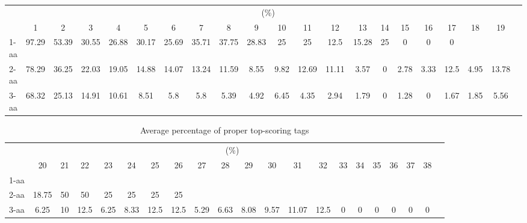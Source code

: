 \begin{table}[h]\tiny
\vspace{3mm}
{\centering
\begin{center}
\begin{tabular}{|l|c|c|c|c|c|c|c|c|c|c|c|c|c|c|c|c|c|c|c|c|}
  \hline
  & \multicolumn{ 19 }{|c|}{(\%)} \\
  \cline{2- 20}
    & 1 & 2 & 3 & 4 & 5 & 6 & 7 & 8 & 9 & 10 & 11 & 12 & 13 & 14 & 15 & 16 & 17 & 18 & 19\\
  \hline
1-aa  & 97.29 & 53.39 & 30.55 & 26.88 & 30.17 & 25.69 & 35.71 & 37.75 & 28.83 & 25 & 25 & 12.5 & 15.28 & 25 & 0 & 0 & 0 &  & \\
2-aa  & 78.29 & 36.25 & 22.03 & 19.05 & 14.88 & 14.07 & 13.24 & 11.59 & 8.55 & 9.82 & 12.69 & 11.11 & 3.57 & 0 & 2.78 & 3.33 & 12.5 & 4.95 & 13.78\\
3-aa  & 68.32 & 25.13 & 14.91 & 10.61 & 8.51 & 5.8 & 5.8 & 5.39 & 4.92 & 6.45 & 4.35 & 2.94 & 1.79 & 0 & 1.28 & 0 & 1.67 & 1.85 & 5.56\\
 \hline
\end{tabular}
\end{center}
\par}
\centering

\vspace{3mm}
\label{table:k}
\end{table}
\begin{table}[h]\tiny
\vspace{3mm}
{\centering
\begin{center}
\begin{tabular}{|l|c|c|c|c|c|c|c|c|c|c|c|c|c|c|c|c|c|c|c|c|}
  \hline
  & \multicolumn{ 19 }{|c|}{(\%)} \\
  \cline{2- 20}
    & 20 & 21 & 22 & 23 & 24 & 25 & 26 & 27 & 28 & 29 & 30 & 31 & 32 & 33 & 34 & 35 & 36 & 37 & 38\\
  \hline
1-aa  &  &  &  &  &  &  &  &  &  &  &  &  &  &  &  &  &  &  & \\
2-aa  & 18.75 & 50 & 50 & 25 & 25 & 25 & 25 &  &  &  &  &  &  &  &  &  &  &  & \\
3-aa  & 6.25 & 10 & 12.5 & 6.25 & 8.33 & 12.5 & 12.5 & 5.29 & 6.63 & 8.08 & 9.57 & 11.07 & 12.5 & 0 & 0 & 0 & 0 & 0 & 0\\
 \hline
\end{tabular}
\end{center}
\par}
\centering

\caption{ Average percentage of proper top-scoring tags}

\vspace{3mm}
\label{table:k}
\end{table}
